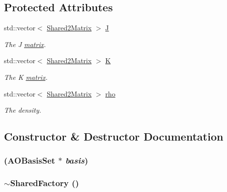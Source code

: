 \subsection*{Protected Attributes}
\begin{DoxyCompactItemize}
\item 
std::vector$<$ \hyperlink{namespaceJKBuilder_a490b0a0cd0b0f8f0e280e29b03eb51a3}{Shared2Matrix} $>$ \hyperlink{classJKBuilder_1_1SharedFactory_afabc3015deddc9247c1c2822431a724f}{J}
\begin{DoxyCompactList}\small\item\em The J \hyperlink{classJKBuilder_1_1matrix}{matrix}. \item\end{DoxyCompactList}\item 
std::vector$<$ \hyperlink{namespaceJKBuilder_a490b0a0cd0b0f8f0e280e29b03eb51a3}{Shared2Matrix} $>$ \hyperlink{classJKBuilder_1_1SharedFactory_a59469c5d5576ee51c033626879e699b1}{K}
\begin{DoxyCompactList}\small\item\em The K \hyperlink{classJKBuilder_1_1matrix}{matrix}. \item\end{DoxyCompactList}\item 
std::vector$<$ \hyperlink{namespaceJKBuilder_a490b0a0cd0b0f8f0e280e29b03eb51a3}{Shared2Matrix} $>$ \hyperlink{classJKBuilder_1_1SharedFactory_af21e4022fc5e357635e5b22bb359fcba}{rho}
\begin{DoxyCompactList}\small\item\em The density. \item\end{DoxyCompactList}\end{DoxyCompactItemize}


\subsection{Constructor \& Destructor Documentation}
\hypertarget{classJKBuilder_1_1SharedFactory_aaa83ebf150f7d8a94957a024e3b93251}{
\subsubsection[{SharedFactory}]{ ({\bf AOBasisSet} $\ast$ {\em basis})}}
\label{classJKBuilder_1_1SharedFactory_aaa83ebf150f7d8a94957a024e3b93251}
\hypertarget{classJKBuilder_1_1SharedFactory_af0da783c0ceefa7d1f2bf9be1cd53ba6}{
\subsubsection[{$\sim$SharedFactory}]{\setlength{\rightskip}{0pt plus 5cm}$\sim${\bf SharedFactory} ()}}
\label{classJKBuilder_1_1SharedFactory_af0da783c0ceefa7d1f2bf9be1cd53ba6}



